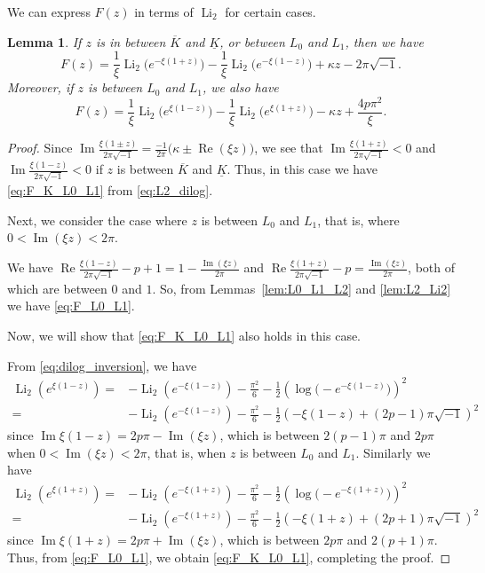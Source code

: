 \documentclass[a4paper,dvipdfmx]{amsart}
\theoremstyle{plain}
\newtheorem{lem}[thm]{Lemma}
\theoremstyle{definition}
\theoremstyle{remark}
\newcommand{\Li}{\operatorname{Li}}
\renewcommand{\Re}{\operatorname{Re}}
\renewcommand{\Im}{\operatorname{Im}}
\renewcommand{\i}{\sqrt{-1}}
\numberwithin{equation}{section}
\begin{document}
\par
We can express $F(z)$ in terms of $\Li_2$ for certain cases.
\begin{lem}\label{lem:F_Li2}
If $z$ is in between $\overline{K}$ and $\underline{K}$, or between $L_0$ and $L_1$, then we have
\begin{equation}\label{eq:F_K_L0_L1}
  F(z)
  =
  \frac{1}{\xi}\Li_2\bigl(e^{-\xi(1+z)}\bigr)
  -
  \frac{1}{\xi}\Li_2\bigl(e^{-\xi(1-z)}\bigr)
  +\kappa z-2\pi\i.
\end{equation}
Moreover, if $z$ is between $L_0$ and $L_1$, we also have
\begin{equation}\label{eq:F_L0_L1}
  F(z)
  =
  \frac{1}{\xi}\Li_2\bigl(e^{\xi(1-z)}\bigr)
  -
  \frac{1}{\xi}\Li_2\bigl(e^{\xi(1+z)}\bigr)
  -\kappa z+\frac{4p\pi^2}{\xi}.
\end{equation}
\end{lem}
\begin{proof}
Since $\Im\frac{\xi(1\pm z)}{2\pi\i}=\frac{-1}{2\pi}\bigl(\kappa\pm\Re(\xi z)\bigr)$, we see that $\Im\frac{\xi(1+z)}{2\pi\i}<0$ and $\Im\frac{\xi(1-z)}{2\pi\i}<0$ if $z$ is between $\overline{K}$ and $\underline{K}$.
Thus, in this case we have \eqref{eq:F_K_L0_L1} from \eqref{eq:L2_dilog}.
\par
Next, we consider the case where $z$ is between $L_0$ and $L_1$, that is, where $0<\Im(\xi z)<2\pi$.
\par
We have $\Re\frac{\xi(1-z)}{2\pi\i}-p+1=1-\frac{\Im(\xi z)}{2\pi}$ and $\Re\frac{\xi(1+z)}{2\pi\i}-p=\frac{\Im(\xi z)}{2\pi}$, both of which are between $0$ and $1$.
So, from Lemmas~\ref{lem:L0_L1_L2} and \ref{lem:L2_Li2} we have \eqref{eq:F_L0_L1}.
\par
Now, we will show that \eqref{eq:F_K_L0_L1} also holds in this case.
\par
From \eqref{eq:dilog_inversion}, we have
\begin{align*}
  \Li_2\left(e^{\xi(1-z)}\right)
  =&
  -\Li_2\left(e^{-\xi(1-z)}\right)
  -\frac{\pi^2}{6}
  -\frac{1}{2}\left(\log\bigl(-e^{-\xi(1-z)}\bigr)\right)^2
  \\
  =&
  -\Li_2\left(e^{-\xi(1-z)}\right)
  -\frac{\pi^2}{6}
  -\frac{1}{2}\left(-\xi(1-z)+(2p-1)\pi\i\right)^2
\end{align*}
since $\Im\xi(1-z)=2p\pi-\Im(\xi z)$, which is between $2(p-1)\pi$ and $2p\pi$ when $0<\Im(\xi z)<2\pi$, that is, when $z$ is between $L_0$ and $L_1$.
Similarly we have
\begin{align*}
  \Li_2\left(e^{\xi(1+z)}\right)
  =&
  -\Li_2\left(e^{-\xi(1+z)}\right)
  -\frac{\pi^2}{6}
  -\frac{1}{2}\left(\log\bigl(-e^{-\xi(1+z)}\bigr)\right)^2
  \\
  =&
  -\Li_2\left(e^{-\xi(1+z)}\right)
  -\frac{\pi^2}{6}
  -\frac{1}{2}\left(-\xi(1+z)+(2p+1)\pi\i\right)^2
\end{align*}
since $\Im\xi(1+z)=2p\pi+\Im(\xi z)$, which is between $2p\pi$ and $2(p+1)\pi$.
Thus, from \eqref{eq:F_L0_L1}, we obtain \eqref{eq:F_K_L0_L1}, completing the proof.
\end{proof}
\end{document}
